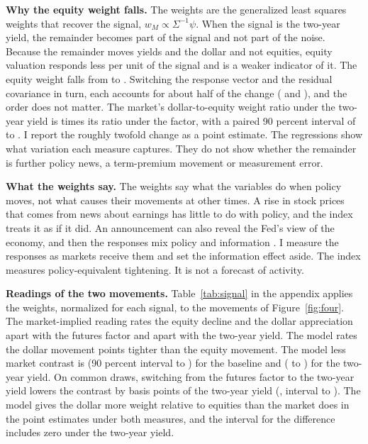 \documentclass[11pt]{article}
\begin{document}
\textbf{Why the equity weight falls.} The weights are the generalized least squares weights that recover the signal, $w_M\propto\Sigma^{-1}\psi$. When the signal is the two-year yield, the remainder becomes part of the signal and not part of the noise. Because the remainder moves yields and the dollar and not equities, equity valuation responds less per unit of the signal and is a weaker indicator of it. The equity weight falls from  to . Switching the response vector and the residual covariance in turn, each accounts for about half of the change ( and ), and the order does not matter. The market's dollar-to-equity weight ratio under the two-year yield is  times its ratio under the factor, with a paired 90 percent interval of  to . I report the roughly twofold change as a point estimate. The regressions show what variation each measure captures. They do not show whether the remainder is further policy news, a term-premium movement or measurement error.

\textbf{What the weights say.} The weights say what the variables do when policy moves, not what causes their movements at other times. A rise in stock prices that comes from news about earnings has little to do with policy, and the index treats it as if it did. An announcement can also reveal the Fed's view of the economy, and then the responses mix policy and information \citep{nakamura2018}. I measure the responses as markets receive them and set the information effect aside. The index measures policy-equivalent tightening. It is not a forecast of activity.

\textbf{Readings of the two movements.} Table~\ref{tab:signal} in the appendix applies the weights, normalized for each signal, to the movements of Figure~\ref{fig:four}. The market-implied reading rates the equity decline and the dollar appreciation  apart with the futures factor and  apart with the two-year yield. The model rates the dollar movement  points tighter than the equity movement. The model less market contrast is  (90 percent interval  to ) for the baseline and  ( to ) for the two-year yield. On common draws, switching from the futures factor to the two-year yield lowers the contrast by  basis points of the two-year yield (, interval  to ). The model gives the dollar more weight relative to equities than the market does in the point estimates under both measures, and the interval for the difference includes zero under the two-year yield.
\end{document}
